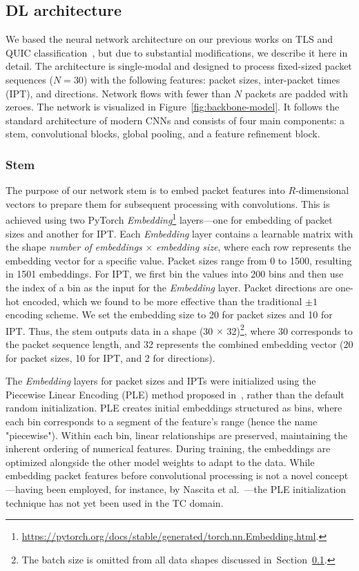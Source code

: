 \documentclass[lettersize,journal,twoside,article]{IEEEtran}
\newcommand{\secref}[1]{Section~\ref{#1}}
\begin{document}
\subsection{DL architecture}
\label{sec:dl-architecture}
We based the neural network architecture on our previous works on TLS and QUIC classification~\cite{Luxemburk2023TLS, Luxemburk2023QUIC}, but due to substantial modifications, we describe it here in detail. The architecture is single-modal and designed to process fixed-sized packet sequences ($N = 30$) with the following features: packet sizes, inter-packet times (IPT), and directions. Network flows with fewer than $N$ packets are padded with zeroes. The network is visualized in Figure~\ref{fig:backbone-model}. It follows the standard architecture of modern CNNs and consists of four main components: a stem, convolutional blocks, global pooling, and a feature refinement block.

\subsubsection{Stem}
\label{sec:stem}
The purpose of our network stem is to embed packet features into $R$-dimensional vectors to prepare them for subsequent processing with convolutions. This is achieved using two PyTorch \textit{Embedding}\footnote{\url{https://pytorch.org/docs/stable/generated/torch.nn.Embedding.html}.} layers---one for embedding of packet sizes and another for IPT. Each \textit{Embedding} layer contains a learnable matrix with the shape \textit{number of embeddings} $\times$ \textit{embedding size}, where each row represents the embedding vector for a specific value. Packet sizes range from 0 to 1500, resulting in 1501 embeddings. For IPT, we first bin the values into 200 bins and then use the index of a bin as the input for the \textit{Embedding} layer. Packet directions are one-hot encoded, which we found to be more effective than the traditional $\pm1$ encoding scheme. We set the embedding size to 20 for packet sizes and 10 for IPT. Thus, the stem outputs data in a shape (30 $\times$ 32)\footnote{The batch size is omitted from all data shapes discussed in~\secref{sec:dl-architecture}.}, where 30 corresponds to the packet sequence length, and 32 represents the combined embedding vector (20 for packet sizes, 10 for IPT, and 2 for directions).

The \textit{Embedding} layers for packet sizes and IPTs were initialized using the Piecewise Linear Encoding (PLE) method proposed in~\cite{gorishniy2022embeddings}, rather than the default random initialization. PLE creates initial embeddings structured as bins, where each bin corresponds to a segment of the feature's range (hence the name "piecewise"). Within each bin, linear relationships are preserved, maintaining the inherent ordering of numerical features. During training, the embeddings are optimized alongside the other model weights to adapt to the data. While embedding packet features before convolutional processing is not a novel concept---having been employed, for instance, by Nascita et al.~\cite{Nascita2021FirstEmbeddings, Nascita2023Embeddings}---the PLE initialization technique has not yet been used in the TC domain. 
\end{document}
